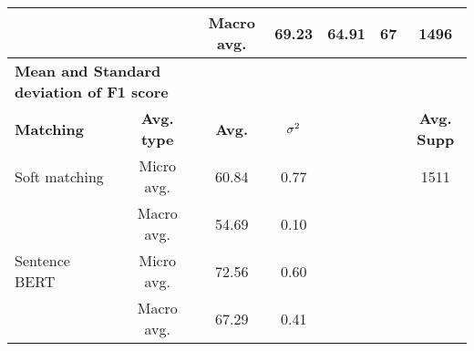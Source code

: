 \begin{table}[htbp]
\begin{tabular}{lcccccc}
    & & Macro avg. & 69.23 & 64.91 & 67 & 1496 \\
    \midrule
    \multicolumn{2}{l}{\textbf{Mean and Standard deviation of F1 score}} & & & & & \\
    \midrule
    \textbf{Matching} & \textbf{Avg. type} & \textbf{Avg.} & $\sigma\textsuperscript{2}$ & & & \textbf{Avg. Supp}\\
    Soft matching & Micro avg. & 60.84 & 0.77 & & & 1511 \\
    & Macro avg. & 54.69 & 0.10 & & & \\
    Sentence BERT & Micro avg. & 72.56 & 0.60 & & & \\
    & Macro avg. & 67.29 & 0.41 & & & \\
    \bottomrule
  \end{tabular}
\end{table}



